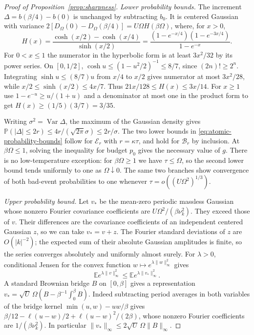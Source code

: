 \documentclass[11pt]{article}
\DeclareMathOperator{\Var}{Var}
\begin{document}
\begin{proof}[Proof of Proposition~\ref{prop:sharpness}]
\emph{Lower probability bounds.}
The increment $\Delta=b(\beta/4)-b(0)$ is unchanged by subtracting $b_0$. It is centered Gaussian with variance $2[D_\Omega(0)-D_\Omega(\beta/4)]=U\Omega H(\beta\Omega)$, where, for $x>0$,
\[
 H(x)=\frac{\cosh(x/2)-\cosh(x/4)}{\sinh(x/2)}
     =\frac{(1-e^{-x/4})(1-e^{-3x/4})}{1-e^{-x}} .
\]
For $0<x\le1$ the numerator in the hyperbolic form is at least $3x^2/32$ by its power series. On $[0,1/2]$, $\cosh u\le(1-u^2/2)^{-1}\le8/7$, since $(2n)!\ge 2^n$. Integrating $\sinh u\le(8/7)u$ from $x/4$ to $x/2$ gives numerator at most $3x^2/28$, while $x/2\le\sinh(x/2)\le4x/7$. Thus $21x/128\le H(x)\le3x/14$. For $x\ge1$ use $1-e^{-u}\ge u/(1+u)$ and a denominator at most one in the product form to get $H(x)\ge(1/5)(3/7)=3/35$.

Writing $\sigma^2=\Var\Delta$, the maximum of the Gaussian density gives $\mathbb P(|\Delta|\le2r)\le4r/(\sqrt{2\pi}\sigma)\le2r/\sigma$. The two lower bounds in \eqref{eq:atomic-probability-bounds} follow for $\mathcal E_r$ with $r=\kappa\tau$, and hold for $\mathcal B_r$ by inclusion. At $\beta\Omega\le1$, solving the inequality for budget $p_0$ gives the necessary value of $g$. There is no low-temperature exception: for $\beta\Omega\ge1$ we have $\tau\le\Omega$, so the second lower bound tends uniformly to one as $\Omega\downarrow0$. The same two branches show convergence of both bad-event probabilities to one whenever $\tau=o((U\Omega^2)^{1/3})$.

\emph{Upper probability bound.}
Let $v_*$ be the mean-zero periodic massless Gaussian whose nonzero Fourier covariance coefficients are $U\Omega^2/(\beta\nu_k^2)$. They exceed those of $v$. Their differences are the covariance coefficients of an independent centered Gaussian $z$, so we can take $v_*=v+z$. The Fourier standard deviations of $z$ are $O(|k|^{-2})$; the expected sum of their absolute Gaussian amplitudes is finite, so the series converges absolutely and uniformly almost surely. For $\lambda>0$, conditional Jensen for the convex function $w\mapsto e^{\lambda\|w\|_\infty^2}$ gives
\[
 \mathbb E e^{\lambda\|v\|_\infty^2}\le \mathbb E e^{\lambda\|v_*\|_\infty^2}.
\]
A standard Brownian bridge $B$ on $[0,\beta]$ gives a representation $v_*=\sqrt U\,\Omega(B-\beta^{-1}\int_0^\beta B)$. Indeed subtracting period averages in both variables of the bridge kernel $\min(u,w)-uw/\beta$ gives $\beta/12-\ell(u-w)/2+\ell(u-w)^2/(2\beta)$, whose nonzero Fourier coefficients are $1/(\beta\nu_k^2)$. In particular $\|v_*\|_\infty\le2\sqrt U\,\Omega\|B\|_\infty$.


\end{proof}
\end{document}
